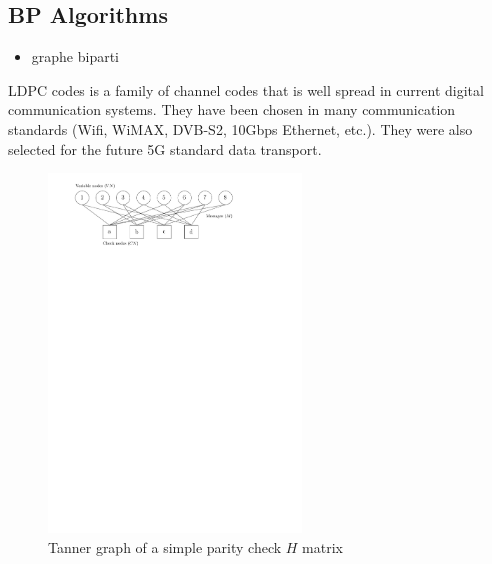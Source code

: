 \subsection{BP Algorithms}

\begin{itemize}
  \item graphe biparti
\end{itemize}

LDPC codes is a family of channel codes that is well spread in current digital
communication systems. They have been chosen in many communication standards
(Wifi, WiMAX, DVB-S2, 10Gbps Ethernet, etc.). They were also selected for the
future 5G standard data transport.

\begin{figure}
  \centering
  \includegraphics[width=0.60\textwidth]{ldpc/ldpc_tanner_graph}
  \caption{Tanner graph of a simple parity check $H$ matrix}
  \label{fig:LDPC}
\end{figure}

